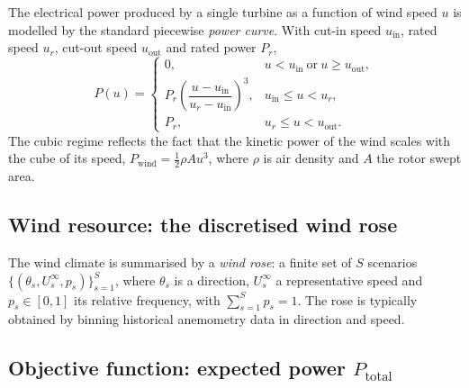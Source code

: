 \documentclass[11pt,a4paper]{article}
\begin{document}
The electrical power produced by a single turbine as a function of wind speed
$u$ is modelled by the standard piecewise \emph{power curve}. With cut-in speed
$u_{\text{in}}$, rated speed $u_{r}$, cut-out speed $u_{\text{out}}$ and rated
power $P_{r}$,
\begin{equation}
  P(u) =
  \begin{cases}
    0, & u < u_{\text{in}} \ \text{or} \ u \ge u_{\text{out}},\\[1mm]
    P_{r}\left(\dfrac{u-u_{\text{in}}}{u_{r}-u_{\text{in}}}\right)^{3},
      & u_{\text{in}} \le u < u_{r},\\[2mm]
    P_{r}, & u_{r} \le u < u_{\text{out}}.
  \end{cases}
  \label{eq:power-curve}
\end{equation}
The cubic regime reflects the fact that the kinetic power of the wind scales
with the cube of its speed, $P_{\text{wind}}=\tfrac12\rho A u^{3}$, where
$\rho$ is air density and $A$ the rotor swept area.

\subsection{Wind resource: the discretised wind rose}

The wind climate is summarised by a \emph{wind rose}: a finite set of $S$
scenarios $\{(\theta_{s}, U_{s}^{\infty}, p_{s})\}_{s=1}^{S}$, where
$\theta_{s}$ is a direction, $U_{s}^{\infty}$ a representative speed and
$p_{s}\in[0,1]$ its relative frequency, with $\sum_{s=1}^{S}p_{s}=1$. The rose is
typically obtained by binning historical anemometry data in direction and speed.

\subsection{Objective function: expected power \texorpdfstring{$P_{\text{total}}$}{P\_total}}
\end{document}
